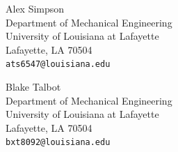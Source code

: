 \documentclass[12pt]{article}
\begin{document}
\begin{center}
\begin{figure}[!h]
\begin{minipage}{0.45\textwidth}
\begin{center}
Alex Simpson \\
Department of Mechanical Engineering\\
University of Louisiana at Lafayette\\
Lafayette, LA 70504\\
\tt{ats6547@louisiana.edu}
\end{center}
\end{minipage}
\end{figure}
\vspace{0.2in}
\begin{figure}[!h]
\begin{center}
Blake Talbot\\
Department of Mechanical Engineering\\
University of Louisiana at Lafayette\\
Lafayette, LA 70504\\
{\tt bxt8092@louisiana.edu}
\end{center}
\end{figure}


\end{center}
%
\newpage
\thispagestyle{empty}
\end{document}
